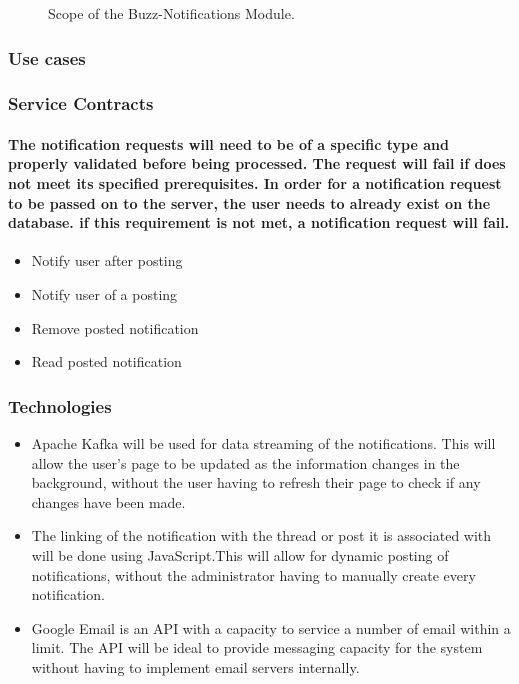 \documentclass[12pt]{article}
\begin{document}
\begin{figure}[h]
\iffalse\texttt{[image: Diagrams/scopeNotif.jpeg]}\fi
\caption{Scope of the Buzz-Notifications Module.}
\label{Use-case: Buzz-Notif Module}
\end{figure}

\subsubsection{Use cases}

\subsubsection{Service Contracts}
\paragraph{The notification requests will need to be of a specific type and properly validated before being processed. The request will fail if does not meet its specified prerequisites. In order for a notification request to be passed on to the server, the user needs to already exist on the database. if this requirement is not met, a notification request will fail.}
\begin{itemize}
\item Notify user after posting
\item Notify user of a posting
\item Remove posted notification 
\item Read posted notification
\end{itemize}

\subsubsection{Technologies}

\begin{itemize}
\item Apache Kafka will be used for data streaming of the notifications. This will allow the user's page to be updated as the information changes in the background, without the user having to refresh their page to check if any changes have been made.
\item The linking of the notification with the thread or post it is associated with will be done using JavaScript.This will allow for dynamic posting of notifications, without the administrator having to manually create every notification.
\item Google Email is an API with a capacity to service a number of email within a limit. The API will be ideal to provide messaging capacity for the system without having to implement email servers internally.
\end{itemize}
\end{document}
